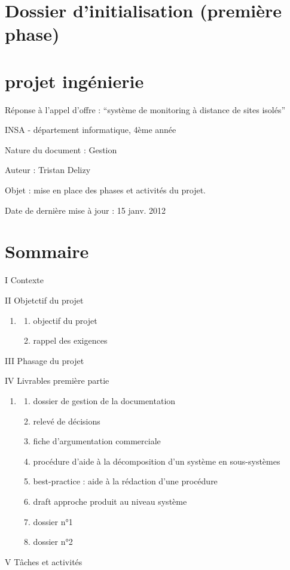 \documentclass{article}
\title{}
\author{}
\date{}
\begin{document}
\section[Dossier d’initialisation (première phase)]{Dossier
d’initialisation (première phase)}
\section{projet ingénierie}
Réponse à l’appel d’offre : “système de monitoring à distance de sites
isolés”

INSA - département informatique, 4ème année

Nature du document : Gestion

Auteur : Tristan Delizy

Objet : mise en place des phases et activités du projet.

Date de dernière mise à jour : 15 janv. 2012

\section[Sommaire]{Sommaire}
I Contexte

II Objetctif du projet

\begin{enumerate}
\item \begin{enumerate}
\item objectif du projet
\item rappel des exigences
\end{enumerate}
\end{enumerate}
III Phasage du projet

IV Livrables première partie

\begin{enumerate}
\item \begin{enumerate}
\item dossier de gestion de la documentation
\item relevé de décisions
\item fiche d’argumentation commerciale
\item procédure d’aide à la décomposition d’un système en sous-systèmes
\item best-practice : aide à la rédaction d’une procédure
\item draft approche produit au niveau système
\item dossier n°1
\item dossier n°2
\end{enumerate}
\end{enumerate}
V Tâches et activités
\end{document}
